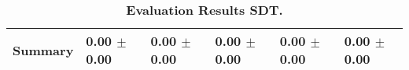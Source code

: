 \begin{table}[htb]
{\begin{tabular}{llllll}
\midrule
\textbf{Summary                                  } &  \phantom{0}0.00 $\pm$ \phantom{0}0.00 &             \phantom{0}0.00 $\pm$ \phantom{0}0.00 &  \phantom{0}0.00 $\pm$ \phantom{0}0.00 &  \phantom{0}0.00 $\pm$ \phantom{0}0.00 &  \phantom{0}0.00 $\pm$ \phantom{0}0.00 \\
\bottomrule
\end{tabular}%
}
\caption{\textbf{Evaluation Results SDT.}}
\label{tab:eval-results}
\end{table}
\newpage 
